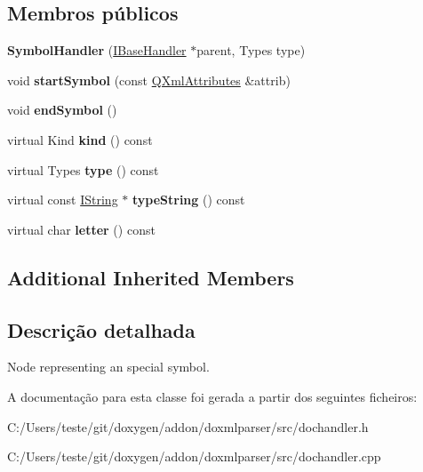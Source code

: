 \subsection*{Membros públicos}
\begin{DoxyCompactItemize}
\item 
\hypertarget{class_symbol_handler_acf2a3398048df52595bfd17f879a36ff}{{\bfseries Symbol\-Handler} (\hyperlink{class_i_base_handler}{I\-Base\-Handler} $\ast$parent, Types type)}\label{class_symbol_handler_acf2a3398048df52595bfd17f879a36ff}

\item 
\hypertarget{class_symbol_handler_ace381fa551fb19e1e0371da370934a44}{void {\bfseries start\-Symbol} (const \hyperlink{class_q_xml_attributes}{Q\-Xml\-Attributes} \&attrib)}\label{class_symbol_handler_ace381fa551fb19e1e0371da370934a44}

\item 
\hypertarget{class_symbol_handler_a6e1ce2d7162c2f9530e6a007572a2a4e}{void {\bfseries end\-Symbol} ()}\label{class_symbol_handler_a6e1ce2d7162c2f9530e6a007572a2a4e}

\item 
\hypertarget{class_symbol_handler_af8e62c8a81ddf2283205cc8955de50eb}{virtual Kind {\bfseries kind} () const }\label{class_symbol_handler_af8e62c8a81ddf2283205cc8955de50eb}

\item 
\hypertarget{class_symbol_handler_ada76a4f391850a616335245f2634b41c}{virtual Types {\bfseries type} () const }\label{class_symbol_handler_ada76a4f391850a616335245f2634b41c}

\item 
\hypertarget{class_symbol_handler_a0b83e685101612077522408e5adce410}{virtual const \hyperlink{class_i_string}{I\-String} $\ast$ {\bfseries type\-String} () const }\label{class_symbol_handler_a0b83e685101612077522408e5adce410}

\item 
\hypertarget{class_symbol_handler_ac481b287893db84e9977a30830b20612}{virtual char {\bfseries letter} () const }\label{class_symbol_handler_ac481b287893db84e9977a30830b20612}

\end{DoxyCompactItemize}
\subsection*{Additional Inherited Members}


\subsection{Descrição detalhada}
Node representing an special symbol. 



A documentação para esta classe foi gerada a partir dos seguintes ficheiros\-:\begin{DoxyCompactItemize}
\item 
C\-:/\-Users/teste/git/doxygen/addon/doxmlparser/src/dochandler.\-h\item 
C\-:/\-Users/teste/git/doxygen/addon/doxmlparser/src/dochandler.\-cpp\end{DoxyCompactItemize}
